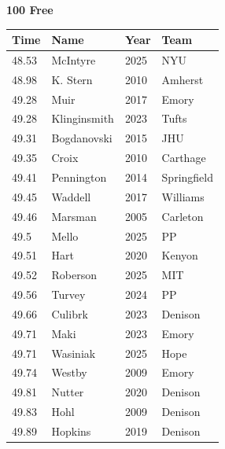 \vspace{1.2em}
\noindent\begin{minipage}[t]{0.98\textwidth}
\centering
\textbf{\textcolor{teamprimary}{100 Free}}\par
\vspace{0.5em}
\centering
\small
\renewcommand{\arraystretch}{1.0}
\setlength{\tabcolsep}{4pt}
\begin{tabular}{@{}p{2.5cm}p{4.5cm}p{1.5cm}p{2.5cm}@{}}
\toprule
\textbf{Time} & \textbf{Name} & \textbf{Year} & \textbf{Team} \\
\midrule
48.53 & McIntyre & 2025 & NYU \\
48.98 & K. Stern & 2010 & Amherst \\
49.28 & Muir & 2017 & Emory \\
49.28 & Klinginsmith & 2023 & Tufts \\
49.31 & Bogdanovski & 2015 & JHU \\
49.35 & Croix & 2010 & Carthage \\
49.41 & Pennington & 2014 & Springfield \\
49.45 & Waddell & 2017 & Williams \\
49.46 & Marsman & 2005 & Carleton \\
49.5 & Mello & 2025 & PP \\
49.51 & Hart & 2020 & Kenyon \\
49.52 & Roberson & 2025 & MIT \\
49.56 & Turvey & 2024 & PP \\
49.66 & Culibrk & 2023 & Denison \\
49.71 & Maki & 2023 & Emory \\
49.71 & Wasiniak & 2025 & Hope \\
49.74 & Westby & 2009 & Emory \\
49.81 & Nutter & 2020 & Denison \\
49.83 & Hohl & 2009 & Denison \\
49.89 & Hopkins & 2019 & Denison \\
\bottomrule
\end{tabular}
\end{minipage}
\vspace{1.2em}
